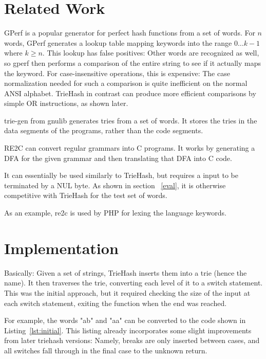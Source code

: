 \documentclass[parskip=half]{scrartcl}
\begin{document}
    \section{Related Work}
    GPerf\cite{schmidt2000gperf} is a popular generator for perfect hash
    functions from a set of words. For $n$ words, GPerf generates a lookup
    table mapping keywords into the range $0\ldots k-1$ where $k \ge n$. This
    lookup has false positives: Other words are recognized as well, so gperf
    then performs a comparison of the entire string to see if it actually maps
    the keyword. For case-insensitive operations, this is expensive: The case
    normalization needed for such a comparison is quite inefficient on the
    normal ANSI alphabet. TrieHash in contrast can produce more efficient
    comparisons by simple OR instructions, as shown later.

    trie-gen from gnulib generates tries from a set of words. It stores
    the tries in the data segments of the programs, rather than the code
    segments.

    RE2C\cite{bumbulis1993re2c} can convert regular grammars into C
    programs. It works by generating a DFA for the given grammar and
    then translating that DFA into C code.

    It can essentially be used similarly to TrieHash, but requires a input
    to be terminated by a NUL byte. As shown in section ~\ref{eval}, it is
    otherwise competitive with TrieHash for the test set of words.

    As an example, re2c is used by PHP for lexing the language keywords.
    
    
    \section{Implementation}
    Basically: Given a set of strings, TrieHash inserts them into a trie
    (hence the name). It then traverses the trie, converting each level
    of it to a switch statement. This was the initial approach, but it
    required checking the size of the input at each switch statement,
    exiting the function when the end was reached.

    For example, the words "ab" and "aa" can be converted to the code shown
    in Listing~\ref{lst:initial}. This listing already incorporates some slight
    improvements from later triehash versions: Namely, breaks are only inserted
    between cases, and all switches fall through in the final case to the
    unknown return.
\end{document}
